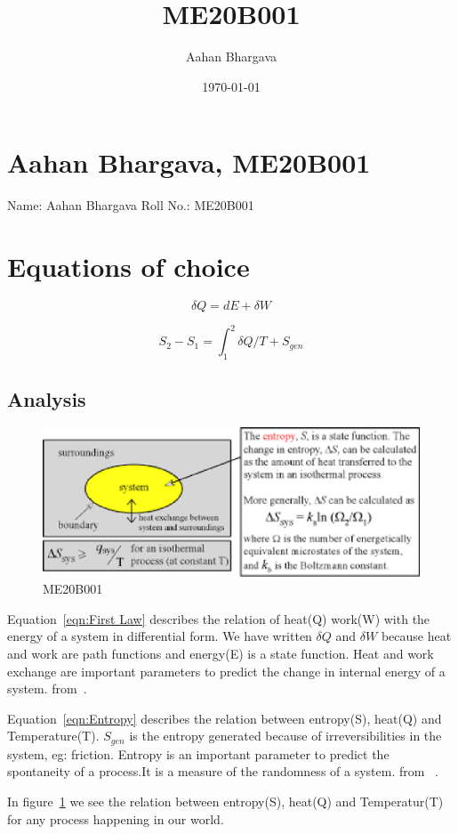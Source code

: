 \documentclass[a4paper, 12pt]{article}
\begin{document}
\title{ME20B001}
\author{Aahan Bhargava}
\date{\today}
\maketitle

\tableofcontents

\listoffigures

\section{Aahan Bhargava, ME20B001}
Name: Aahan Bhargava
Roll No.: ME20B001

\section{Equations of choice}
\begin{equation}
\delta Q = dE + \delta W	
\label{eqn:First Law}
\end{equation}

\begin{equation}
S_2-S_1 = \int_{1}^{2}{\delta Q/T} + S_{gen}
\label{eqn:Entropy}
\end{equation}

\subsection{Analysis}
\begin{figure}[h]
	\begin{center}
		\includegraphics[scale=0.5]{me20b001.eps}
	\end{center}
	\caption{ME20B001}
	\label{entropy}
\end{figure}

Equation~\ref{eqn:First Law} describes the relation of heat(Q) 
work(W) with the energy of a system in differential form.
We have written $ \delta Q $ and $ \delta W $ because heat and work are path functions
and energy(E) is a state function.
Heat and work exchange are important parameters to predict the change in internal energy
of a system.
from~\cite{Myers}.

Equation~\ref{eqn:Entropy} describes the relation between entropy(S), heat(Q)
and Temperature(T). $ S_{gen} $ is the entropy generated because of
irreversibilities in the system, eg: friction.
Entropy is an important parameter to predict the spontaneity of a process.It is a measure
of the randomness of a system.
from ~\cite{Bejan}.

In figure~\ref{entropy} we see the relation between entropy(S), heat(Q) and
Temperatur(T) for any process happening in our world.
 
%
%
\end{document}
